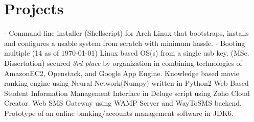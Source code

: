 \documentclass[12pt, a4paper, sans]{moderncv}
\begin{document}
	\section{Projects}
		\cvline{\fontsize{8}{10}\color{lightgray}\faPlus}
					{ - Command-line installer (Shellscript) for Arch
						Linux that bootstraps, installs and configures a usable system from scratch with minimum hassle.
					}
		\cvline{\fontsize{8}{10}\color{lightgray}\faPlus}
					{ - Booting multiple (14 as of \today)
						Linux based OS(s) from a single usb key.
					}
		\cvline{\fontsize{8}{10}\color{lightgray}\faPlus}
					{ (MSc. Dissertation) secured
						\emph{3rd place} by organization in 
					}
		\cvline{\fontsize{8}{10}\color{lightgray}\faPlus}
					{
						combining technologies of AmazonEC2, Openstack, and Google App Engine.
					}
		\cvline{\fontsize{8}{10}\color{lightgray}\faPlus}
					{Knowledge based movie ranking engine using Neural Network(Numpy) written in Python2}
		\cvline{\fontsize{8}{10}\color{lightgray}\faPlus}
					{Web Based Student Information Management Interface in Deluge script using Zoho Cloud Creator.}
		\cvline{\fontsize{8}{10}\color{lightgray}\faPlus}
					{Web SMS Gateway using WAMP Server and WayToSMS backend.}
		\cvline{\fontsize{8}{10}\color{lightgray}\faPlus}
					{Prototype of an online banking/accounts management software in JDK6.}
%
\end{document}
